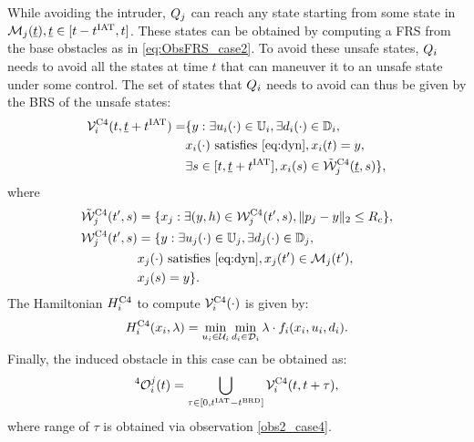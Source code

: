 While avoiding the intruder, $Q_j$ can reach any state starting from some state in $\mathcal{M}_j(\underline{t}), \underline{t} \in [t-t^\text{IAT}, t]$. These states can be obtained by computing a FRS from the base obstacles as in \eqref{eq:ObsFRS_case2}. To avoid these unsafe states, $Q_i$ needs to avoid all the states at time $t$ that can maneuver it to an unsafe state under some control. The set of states that $Q_i$ needs to avoid can thus be given by the BRS of the unsafe states:
\begin{equation}  \label{eq:ObsBRS_case4}
\begin{aligned}
\brs^{\text{C4}}_{i}(t, \tsa + \iat) = & \{y: \exists \ctrl_i(\cdot) \in \cfset_i, \exists \dstb_i(\cdot) \in \dfset_i, \\
& \state_i(\cdot) \text{ satisfies \eqref{eq:dyn}}, \state_i(t) = y, \\
& \exists s \in [t, \tsa + \iat], \state_i(s) \in \tilde{\frs}_j^{\text{C4}}(\tsa, s)\},
\end{aligned}
\end{equation}
where
\begin{equation} \label{eq:ObsFRS_case4}
\begin{aligned}
\tilde{\frs}_{j}^{\text{C4}}(t', s) & = \{\state_j: \exists (y, h) \in \frs_j^{\text{C4}}(t', s), \|\pos_j - y\|_2 \le \rc \},\\
\frs_j^{\text{C4}}(t', s) & = \{y: \exists \ctrl_j(\cdot) \in \cfset_j, \exists \dstb_j(\cdot) \in \dfset_j, \\
& \state_j(\cdot) \text{ satisfies \eqref{eq:dyn}}, \state_j(t') \in \boset_j(t'), \\
& \state_j(s) = y\}.
\end{aligned}
\end{equation} 
The Hamiltonian $H^{\text{C4}}_{i}$ to compute $\mathcal{V}^{\text{C4}}_{i}(\cdot)$ is given by:
\begin{equation} \label{eqn:BRS_obsham}
\ham^{\text{C4}}_{i}(\state_i, \costate) = \min_{\ctrl_i \in \cset_i} \min_{\dstb_i \in \dset_i} \costate \cdot f_i (\state_i, \ctrl_i, \dstb_i).
\end{equation}
Finally, the induced obstacle in this case can be obtained as:
\begin{equation} \label{eq:intruderObs_case4_alt1} 
^4\ioset_i^j(t) = \bigcup_{\tau \in [0, \iat - \brd]} \brs^{\text{C4}}_{i}(t, t + \tau),
\end{equation}
where range of $\tau$ is obtained via observation \ref{obs2_case4}.

